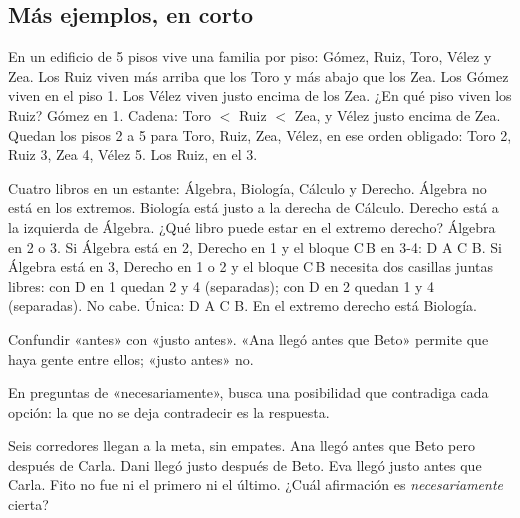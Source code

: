 \subsection{Más ejemplos, en corto}
\begin{ejemplo}
En un edificio de 5 pisos vive una familia por piso: Gómez, Ruiz, Toro, Vélez y Zea. Los Ruiz viven más arriba que los
Toro y más abajo que los Zea. Los Gómez viven en el piso 1. Los Vélez viven justo encima de los Zea. ¿En qué piso viven
los Ruiz?
\solucion Gómez en 1. Cadena: Toro $<$ Ruiz $<$ Zea, y Vélez justo encima de Zea. Quedan los pisos 2 a 5 para Toro,
Ruiz, Zea, Vélez, en ese orden obligado: Toro 2, Ruiz 3, Zea 4, Vélez 5. Los Ruiz, en el 3.
\end{ejemplo}

\begin{ejemplo}
Cuatro libros en un estante: Álgebra, Biología, Cálculo y Derecho. Álgebra no está en los extremos. Biología está justo a
la derecha de Cálculo. Derecho está a la izquierda de Álgebra. ¿Qué libro puede estar en el extremo derecho?
\solucion Álgebra en 2 o 3. Si Álgebra está en 2, Derecho en 1 y el bloque C\,B en 3-4: \textsf{D A C B}. Si Álgebra
está en 3, Derecho en 1 o 2 y el bloque C\,B necesita dos casillas juntas libres: con D en 1 quedan 2 y 4 (separadas); con
D en 2 quedan 1 y 4 (separadas). No cabe. Única: \textsf{D A C B}. En el extremo derecho está Biología.
\end{ejemplo}

\begin{trampa}
Confundir «antes» con «justo antes». «Ana llegó antes que Beto» permite que haya gente entre ellos; «justo antes» no.
\end{trampa}

\begin{atajo}
En preguntas de «necesariamente», busca una posibilidad que contradiga cada opción: la que no se deja contradecir es
la respuesta.
\end{atajo}

\begin{reto}
Seis corredores llegan a la meta, sin empates. Ana llegó antes que Beto pero después de Carla. Dani llegó justo después
de Beto. Eva llegó justo antes que Carla. Fito no fue ni el primero ni el último. ¿Cuál afirmación es
\emph{necesariamente} cierta?
\end{reto}

